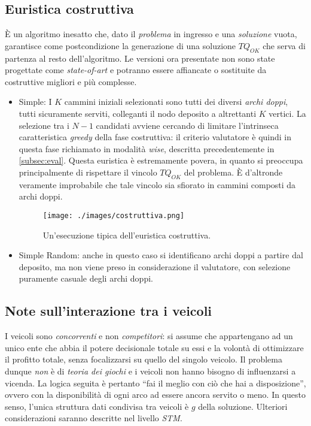 \subsection{Euristica costruttiva} %
\label{subsec:eurconstr}
	È un algoritmo inesatto che, dato il \emph{problema} in ingresso e una \emph{soluzione} vuota, garantisce come postcondizione la
	generazione di una soluzione $TQ_{OK}$ che serva di partenza al resto dell'algoritmo.
	Le versioni ora presentate non sono state progettate come \emph{state-of-art} e potranno essere affiancate o sostituite da
	costruttive migliori e più complesse.
\begin{itemize}
 \item Simple: I $K$ cammini iniziali selezionati sono tutti dei diversi \emph{archi doppi}, tutti sicuramente serviti, colleganti il nodo deposito a altrettanti $K$ vertici. 
  	La selezione tra i $N-1$ candidati avviene cercando di limitare l'intrinseca caratteristica \emph{greedy} della fase costruttiva: il criterio valutatore è quindi in questa
  	fase richiamato in modalità \emph{wise}, descritta precedentemente in \ref{subsec:eval}. Questa euristica è estremamente povera, in quanto si preoccupa principalmente di rispettare il vincolo $TQ_{OK}$ del problema. È d'altronde
	   veramente improbabile che tale vincolo sia sfiorato in cammini composti da archi doppi.
  	\begin{figure}[H] 
	 	\begin{center}\texttt{[image: ./images/costruttiva.png]} \end{center}
	 \caption{Un'esecuzione tipica dell'euristica costruttiva.} \label{fig:costruttiva}
 	\end{figure}
 \item Simple Random: anche in questo caso si identificano archi doppi a partire dal deposito, ma non viene preso in considerazione il valutatore, con selezione puramente casuale degli archi doppi.
\end{itemize}

\subsection{Note sull'interazione tra i veicoli} %
\label{subsec:vehicleinter}
	I veicoli sono \emph{concorrenti} e non \emph{competitori}: si assume che appartengano ad un unico ente che abbia il potere decisionale totale su essi
	e la volontà di ottimizzare il profitto totale, senza focalizzarsi su quello del singolo veicolo. Il problema dunque \emph{non} è di \emph{teoria dei giochi}
	e i veicoli non hanno bisogno di influenzarsi a vicenda. La logica seguita è pertanto ``fai il meglio con ciò che hai a disposizione'', ovvero con la disponibilità
	di ogni arco ad essere ancora servito o meno. In questo senso, l'unica struttura dati condivisa tra veicoli è $g$ della soluzione.
	Ulteriori considerazioni saranno descritte nel livello \emph{STM}.
	
